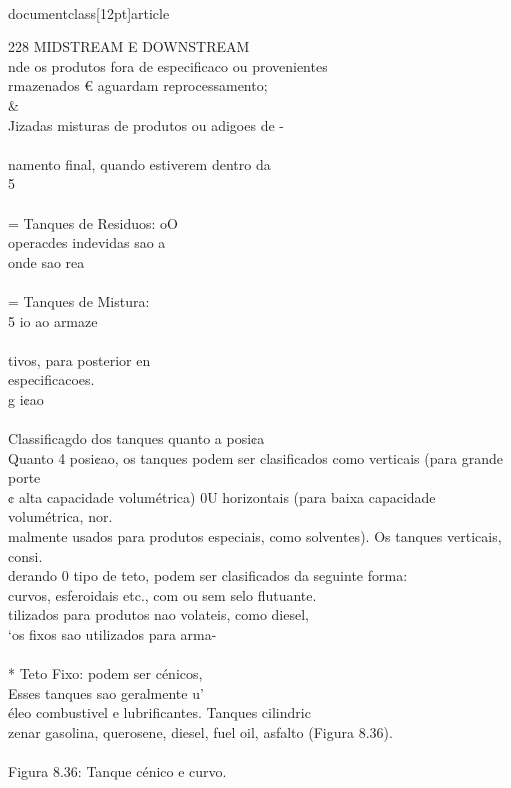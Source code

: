 \\documentclass[12pt]{article}
\begin{document}
228 MIDSTREAM E DOWNSTREAM\\
nde os produtos fora de especificaco ou provenientes\\
rmazenados € aguardam reprocessamento; \\&\\
Jizadas misturas de produtos ou adigoes de -\\
\\
namento final, quando estiverem dentro da\\
5\\
\\
= Tanques de Residuos: oO\\
operacdes indevidas sao a\\
onde sao rea\\
\\
= Tanques de Mistura:\\
5 io ao armaze\\
\\
tivos, para posterior en\\
especificacoes.\\
g i¢ao\\
\\
Classificagdo dos tanques quanto a posi¢a\\
Quanto 4 posi¢ao, os tanques podem ser clasificados como verticais (para grande porte\\
¢ alta capacidade volumétrica) 0U horizontais (para baixa capacidade volumétrica, nor.\\
malmente usados para produtos especiais, como solventes). Os tanques verticais, consi.\\
derando 0 tipo de teto, podem ser clasificados da seguinte forma:\\
curvos, esferoidais etc., com ou sem selo flutuante.\\
tilizados para produtos nao volateis, como diesel,\\
‘os fixos sao utilizados para arma-\\
\\
* Teto Fixo: podem ser cénicos,\\
Esses tanques sao geralmente u'\\
éleo combustivel e lubrificantes. Tanques cilindric\\
zenar gasolina, querosene, diesel, fuel oil, asfalto (Figura 8.36).\\
\\
Figura 8.36: Tanque cénico e curvo.\\
\\
\end{document}
